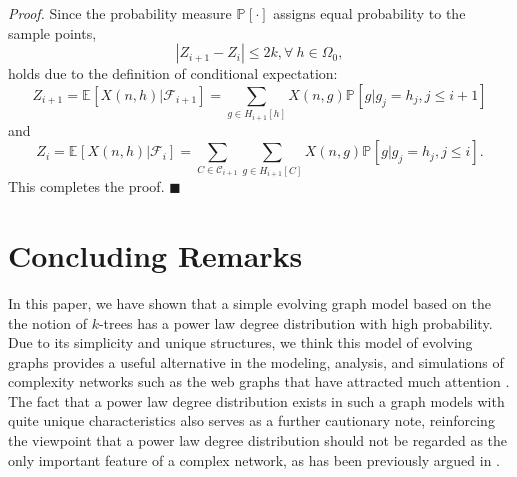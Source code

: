 \documentclass[11pt]{article}
\providecommand{\expectation}[2]{\mathbb{E}_{#2}\left[#1\right]}
\providecommand{\probab}[2]{\mathbb{P}_{#2}\left[#1\right]}
\newenvironment{proof}[0]{\textit{Proof.} }{\hfill  $\blacksquare$ }
\begin{document}
\begin{proof}
Since the probability measure $\probab{\cdot}{}$ assigns equal probability  to the sample points,
$$
    |Z_{i + 1} - Z_{i}| \leq 2k, \forall\ h\in \Omega_0,
$$
holds due to the definition of conditional expectation:
$$
 Z_{i + 1} = \expectation{X(n, h) | \mathcal{F}_{i+1}}{}
  = \sum\limits_{g\in H_{i+1}[h]} X(n, g) \probab{g | g_j = h_j, j \leq i + 1}{}
$$
and
$$
 Z_{i} =  \expectation{X(n, h) | \mathcal{F}_{i}}{}
  = \sum\limits_{C \in \mathcal{C}_{i+1}}
     \sum\limits_{g\in H_{i+1}[C]} X(n, g) \probab{g | g_j = h_j, j \leq i}{}.
$$
This completes the proof.
\end{proof}

\section{Concluding Remarks}
In this paper, we have shown that a simple evolving graph model based on the the notion of $k$-trees has a power law degree distribution with high probability. Due to its simplicity and unique structures, we think this model of evolving graphs provides a useful alternative in the modeling, analysis, and simulations of complexity networks such as the web graphs that have attracted much attention \cite{chakrabarti06}.  The fact that    
a power law degree distribution exists in such a graph models with quite unique characteristics
also serves as a further cautionary note, reinforcing the viewpoint that a power law degree 
distribution should not be regarded as the only important feature of a complex network, as has been previously argued in \cite{dimitris05power,li05,mitzenmacher05}.                
      
\end{document}

